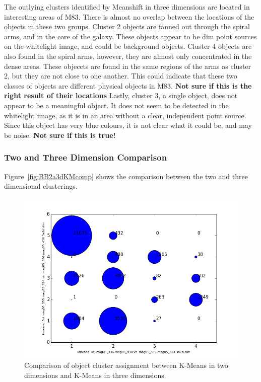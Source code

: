The outlying clusters identified by Meanshift in three dimensions are located in interesting areas of M83.
There is almost no overlap between the locations of the objects in these two groups. 
Cluster 2 objects are fanned out through the spiral arms, and in the core of the galaxy.
These objects appear to be dim point sources on the whitelight image, and could be background objects. 
Cluster 4 objects are also found in the spiral arms, however, they are almost only concentrated in the dense areas. 
These objeccts are found in the same regions of the arms as cluster 2, but they are not close to one another. 
This could indicate that these two classes of objects are different physical objects in M83. \textbf{Not sure if this is the right result of their locations}
Lastly, cluster 3, a single object, does not appear to be a meaningful object. It does not seem to be detected in the whitelight image, as it is in an area without a clear, independent point source.
Since this object has very blue colours, it is not clear what it could be, and may be noise. \textbf{Not sure if this is true!}

\subsubsection{Two and Three Dimension Comparison}
Figure~\ref{fig:BB2a3dKMcomp} shows the comparison between the two and three dimensional clusterings.

\begin{figure}[H]
\centering
\includegraphics[width=\linewidth]{figs/broad/kmeans-4cl_mag05_336-mag05_438_vs_kmeans-5cl_mag05_555-mag05_814_mag05_336-mag05_438_3a2ddim_compare}
\caption{Comparison of object cluster assignment between K-Means in two dimensions and K-Means in three dimensions.}
\label{fig:BB2dMSKMcomp}
\end{figure}

